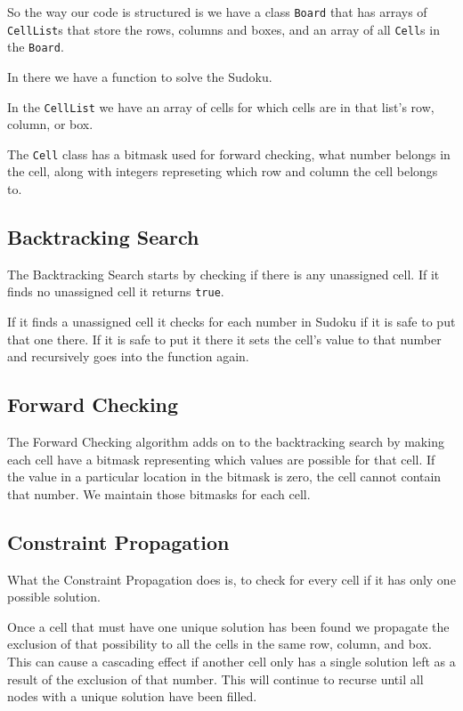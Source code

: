 \documentclass[12pt,a4paper]{article}
\begin{document}
So the way our code is structured is we have a class \verb+Board+ that has arrays of \verb+CellList+s that store the rows, columns and boxes, and an array of all \verb+Cell+s in the \verb+Board+.

In there we have a function to solve the Sudoku.

In the \verb+CellList+ we have an array of cells for which cells are in that list's row, column, or box.

The \verb+Cell+ class has a bitmask used for forward checking,
what number belongs in the cell, along with integers represeting which row and
column the cell belongs to.


\subsection*{Backtracking Search}

The Backtracking Search starts by checking if there is any unassigned cell. If it 
finds no unassigned cell it returns \verb+true+.

If it finds a unassigned cell it checks for each number in Sudoku if it is safe 
to put that one there. If it is safe to put it there it sets the cell's value to that 
number and recursively goes into the function again.

\subsection*{Forward Checking}

The Forward Checking algorithm adds on to the backtracking search by making each 
cell have a bitmask representing which values are possible for that cell. If 
the value in a particular location in the bitmask is zero, the cell cannot
contain that number. We maintain those bitmasks for each cell.

\subsection*{Constraint Propagation}

What the Constraint Propagation does is, to check for every cell if it has only
one possible solution.

Once a cell that must have one unique solution has been found we propagate the
exclusion of that possibility to all the cells in the same row, column, and box.
This can cause a cascading effect if another cell only has a single solution
left as a result of the exclusion of that number. This will continue to recurse
until all nodes with a unique solution have been filled.
\end{document}
